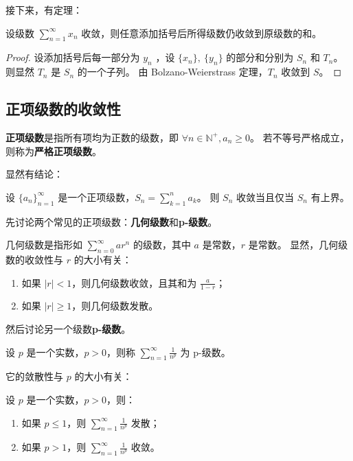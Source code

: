 接下来，有定理：

\begin{theorem}[级数的结合律]\label{thm:infinite-series-associativity}
  设级数 $\sum_{n=1}^{\infty} x_n$ 收敛，则任意添加括号后所得级数仍收敛到原级数的和。
\end{theorem}

\begin{proof}
  设添加括号后每一部分为 $y_n$ ，设 $\{x_n\},\ \{y_n\}$ 的部分和分别为 $S_n$ 和 $T_n$。
  则显然 $T_n$ 是 $S_n$ 的一个子列。
  由 Bolzano-Weierstrass 定理，$T_n$ 收敛到 $S$。
\end{proof}

\subsection{正项级数的收敛性}\label{subsec:positive-series-convergence}

\textbf{正项级数}是指所有项均为正数的级数，即 $\forall n \in \mathbb{N}^+, a_n \geq 0$。
若不等号严格成立，则称为\textbf{严格正项级数}。

显然有结论：

\begin{lemma}\label{lem:positive-series-convergence}
  设 $\{a_n\}_{n=1}^{\infty}$ 是一个正项级数，$S_n = \sum_{k=1}^{n} a_k$。
  则 $S_n$ 收敛当且仅当 $S_n$ 有上界。
\end{lemma}

先讨论两个常见的正项级数：\textbf{几何级数}和\textbf{p-级数}。

几何级数是指形如 $\sum_{n=0}^{\infty} ar^n$ 的级数，其中 $a$ 是常数，$r$ 是常数。
显然，几何级数的收敛性与 $r$ 的大小有关：

\begin{enumerate}
  \item 如果 $|r| < 1$，则几何级数收敛，且其和为 $\frac{a}{1 - r}$；
  \item 如果 $|r| \geq 1$，则几何级数发散。
\end{enumerate}

然后讨论另一个级数\textbf{p-级数}。

\begin{definition}[p-级数]\label{def:p-series}
  设 $p$ 是一个实数，$p > 0$，则称 $\sum_{n=1}^{\infty} \frac{1}{n^p}$ 为 p-级数。
\end{definition}

它的敛散性与 $p$ 的大小有关：

\begin{theorem}[p-级数的敛散性]\label{thm:p-series-convergence}
  设 $p$ 是一个实数，$p > 0$，则：
  \begin{enumerate}
    \item 如果 $p \leq 1$，则 $\sum_{n=1}^{\infty} \frac{1}{n^p}$ 发散；
    \item 如果 $p > 1$，则 $\sum_{n=1}^{\infty} \frac{1}{n^p}$ 收敛。
  \end{enumerate}

\end{theorem}

